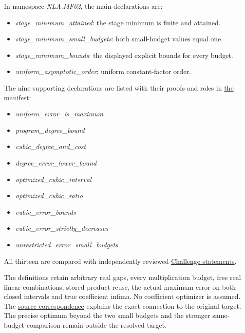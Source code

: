 \documentclass[11pt,a4paper]{article}
\providecommand{\tightlist}{\setlength{\itemsep}{0pt}\setlength{\parskip}{0pt}}
\begin{document}
In namespace \textit{NLA.MF02}, the main declarations are:

\begin{itemize}
\tightlist
\item
  \textit{stage\_minimum\_attained}: the stage minimum is finite and
  attained.
\item
  \textit{stage\_minimum\_small\_budgets}: both small-budget values
  equal one.
\item
  \textit{stage\_minimum\_bounds}: the displayed explicit bounds for
  every budget.
\item
  \textit{uniform\_asymptotic\_order}: uniform constant-factor order.
\end{itemize}

The nine supporting declarations are listed with their proofs and roles
in
\href{https://github.com/ajt60gaibb/OpenProblemsInNLA/blob/main/matrix-functions-and-stability/MF-02/lean/formalization.yaml}{the
manifest}:

\begin{itemize}
\tightlist
\item
  \textit{uniform\_error\_is\_maximum}
\item
  \textit{program\_degree\_bound}
\item
  \textit{cubic\_degree\_and\_cost}
\item
  \textit{degree\_error\_lower\_bound}
\item
  \textit{optimized\_cubic\_interval}
\item
  \textit{optimized\_cubic\_ratio}
\item
  \textit{cubic\_error\_bounds}
\item
  \textit{cubic\_error\_strictly\_decreases}
\item
  \textit{unrestricted\_error\_small\_budgets}
\end{itemize}

All thirteen are compared with independently reviewed
\href{https://github.com/ajt60gaibb/OpenProblemsInNLA/blob/main/matrix-functions-and-stability/MF-02/lean/Challenge.lean}{Challenge
statements}.

The definitions retain arbitrary real gaps, every multiplication budget,
free real linear combinations, stored-product reuse, the actual maximum
error on both closed intervals and true coefficient infima. No
coefficient optimizer is assumed. The
\href{https://github.com/ajt60gaibb/OpenProblemsInNLA/blob/main/matrix-functions-and-stability/MF-02/lean/SourceCorrespondence.md}{source
correspondence} explains the exact connection to the original target.
The precise optimum beyond the two small budgets and the stronger
same-budget comparison remain outside the resolved target.
\end{document}

